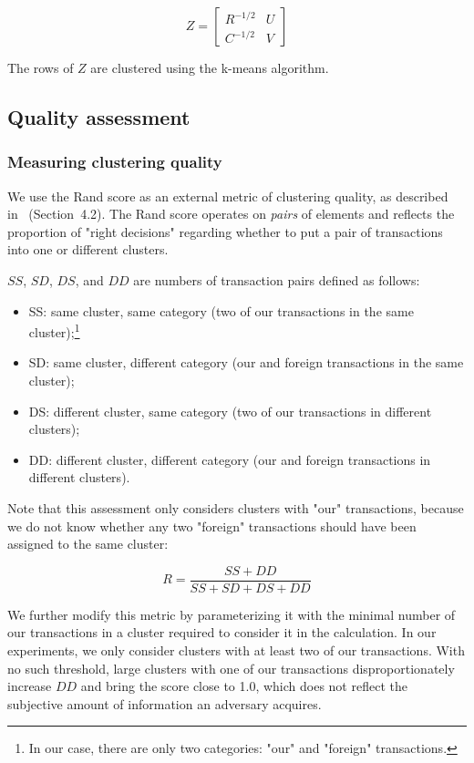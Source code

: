 \[
Z = 
\begin{bmatrix}
R^{-1/2} & U \\
C^{-1/2} & V
\end{bmatrix}
\]

The rows of $Z$ are clustered using the k-means algorithm.

\subsection{Quality assessment}

\subsubsection{Measuring clustering quality}

We use the Rand score as an external metric of clustering quality, as described in~\cite{Amigo2009} (Section~4.2).
The Rand score operates on \textit{pairs} of elements and reflects the proportion of "right decisions" regarding whether to put a pair of transactions into one or different clusters.

$SS$, $SD$, $DS$, and $DD$ are numbers of transaction pairs defined as follows:
\begin{itemize}
	\item SS: same cluster, same category (two of our transactions in the same cluster);\footnote{In our case, there are only two categories: "our" and "foreign" transactions.}
	\item SD: same cluster, different category (our and foreign transactions in the same cluster);
	\item DS: different cluster, same category (two of our transactions in different clusters);
	\item DD: different cluster, different category (our and foreign transactions in different clusters).
\end{itemize}

Note that this assessment only considers clusters with "our" transactions, because we do not know whether any two "foreign" transactions should have been assigned to the same cluster:

\[
R = \frac{SS + DD}{SS + SD + DS + DD}
\]

We further modify this metric by parameterizing it with the minimal number of our transactions in a cluster required to consider it in the calculation.
In our experiments, we only consider clusters with at least two of our transactions.
With no such threshold, large clusters with one of our transactions disproportionately increase $DD$ and bring the score close to 1.0, which does not reflect the subjective amount of information an adversary acquires.

